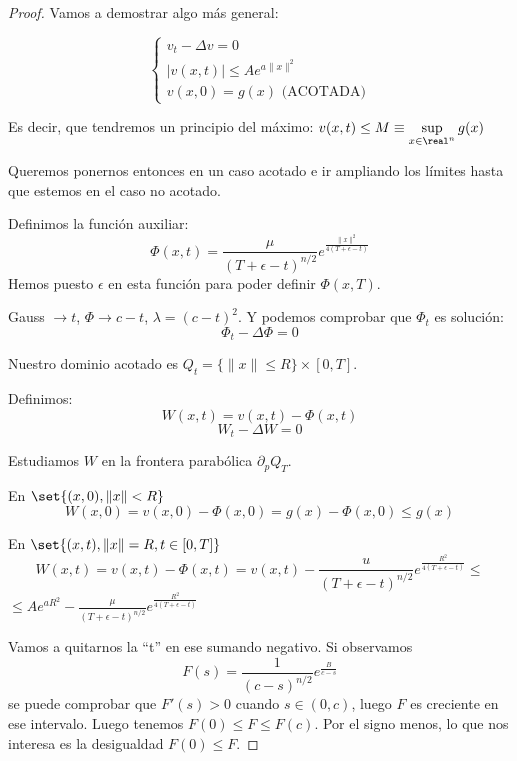 			\begin{proof}
				Vamos a demostrar algo más general:

				\[\begin{cases}
					v_t - \Delta v = 0 \\
					|v(x,t)| \leq A e^{a \|x\|^2} \\
					v(x,0) = g(x) \text{ (ACOTADA)}
				\end{cases}\]

				Es decir, que tendremos un principio del máximo: $v(x,t) \leq M \equiv \sup\limits_{x \in \real^n} g(x)$

				Queremos ponernos entonces en un caso acotado e ir ampliando los límites hasta que estemos en el caso no acotado.

				Definimos la función auxiliar: $$\Phi(x,t) = \frac{\mu}{(T+\epsilon -t)^{n/2}} e^{\frac{\|x\|^2}{4(T + \epsilon - t)}}$$ Hemos puesto $\epsilon$ en esta función para poder definir $\Phi(x,T)$.

				Gauss $\to t$, $\Phi \to c - t$, $\lambda = (c-t)^2$. Y podemos comprobar que $\Phi_t$ es solución:
				\[ \Phi_t - \Delta \Phi = 0\]

				Nuestro dominio acotado es $Q_t = \{ \|x\| \leq R \} \times [0,T]$.

				Definimos:
				\[ W(x,t) = v(x,t) - \Phi(x,t) \]
				\[ W_t - \Delta W = 0\]

				Estudiamos $W$ en la frontera parabólica $\partial_p Q_T$.


				\begin{minipage}[m]{\textwidth}
					\vspace{15pt}
				\end{minipage}

				En $\set{(x,0), \|x\| < R}$
				\[ W(x,0) = v(x,0) - \Phi(x,0) = g(x) - \Phi(x,0) \leq g(x) \]

				En $\set{(x,t), \|x\| = R, t \in [0,T]}$
				\[ W(x,t) = v(x,t) - \Phi(x,t) = v(x,t) - \frac{u}{(T + \epsilon - t)^{n/2}} e^{\frac{R^2}{4(T+\epsilon-t)}} \leq \]
				\( \leq Ae^{aR^2} - \frac{\mu}{(T + \epsilon -t)^{n/2}} e^{\frac{R^2}{4(T + \epsilon - t)}} \label{eq:desigualdad_frontera_prueba_1} \)

				Vamos a quitarnos la ``t'' en ese sumando negativo. Si observamos
				\[ F(s) = \frac{1}{(c-s)^{n/2}} e^{\frac{B}{c-s}}\]
				se puede comprobar que $F'(s) > 0$ cuando $s\in(0,c)$, luego $F$ es creciente en ese intervalo.
				Luego tenemos $F(0) \leq F \leq F(c)$. Por el signo menos, lo que nos interesa es la desigualdad $F(0) \leq F$.


\end{proof}
